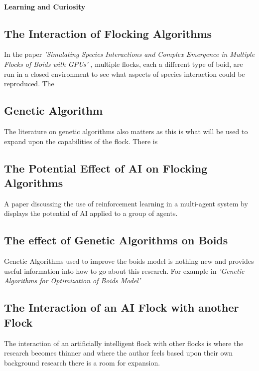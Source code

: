 	\paragraph{Learning and Curiosity}
	
	

\subsection{The Interaction of Flocking Algorithms}
In the paper \textit{'Simulating Species Interactions and Complex Emergence in Multiple Flocks of Boids with GPUs'} \citet{husselmannsimulating}, multiple flocks, each a different type of boid, are run in a closed environment to see what aspects of species interaction could be reproduced. The


\subsection{Genetic Algorithm}
The literature on genetic algorithms also matters as this is what will be used to expand upon the capabilities of the flock. There is 

\subsection{The Potential Effect of AI on Flocking Algorithms}
A paper discussing the use of reinforcement learning in a multi-agent system by \citet{JaderbergMax2018Hpif} displays the potential of AI applied to a group of agents. 

\subsection{The effect of Genetic Algorithms on Boids}
Genetic Algorithms used to improve the boids model is nothing new and provides useful information into how to go about this research. For example in \textit{'Genetic Algorithms for Optimization of Boids Model'} \citet{ChenY.-W.2006Gafo}

\subsection{The Interaction of an AI Flock with another Flock}
The interaction of an artificially intelligent flock with other flocks is where the research becomes thinner and where the author feels based upon their own background research there is a room for expansion. 










